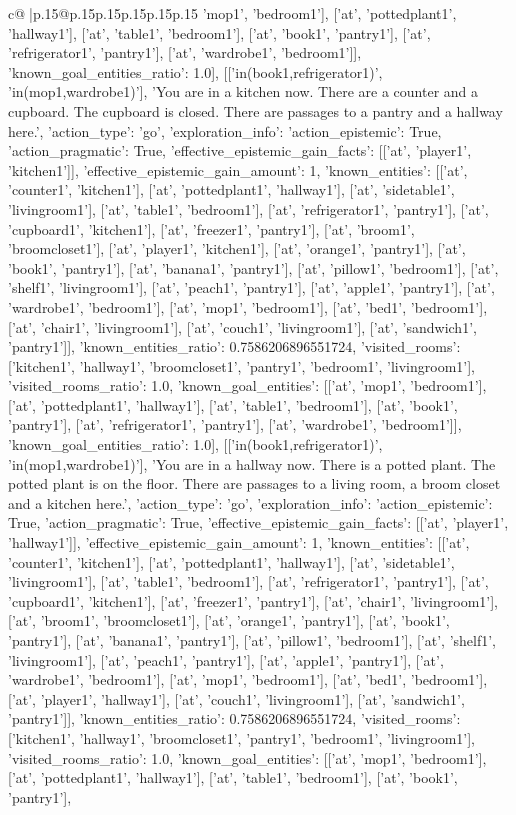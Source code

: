 \documentclass{article}
\begin{document}
{\begin{supertabular}{c@{$\;$}|p{.15\linewidth}@{}p{.15\linewidth}p{.15\linewidth}p{.15\linewidth}p{.15\linewidth}p{.15\linewidth}}
{{{'mop1', 'bedroom1'], ['at', 'pottedplant1', 'hallway1'], ['at', 'table1', 'bedroom1'], ['at', 'book1', 'pantry1'], ['at', 'refrigerator1', 'pantry1'], ['at', 'wardrobe1', 'bedroom1']], 'known_goal_entities_ratio': 1.0}}], [['in(book1,refrigerator1)', 'in(mop1,wardrobe1)'], 'You are in a kitchen now. There are a counter and a cupboard. The cupboard is closed. There are passages to a pantry and a hallway here.', {'action_type': 'go', 'exploration_info': {'action_epistemic': True, 'action_pragmatic': True, 'effective_epistemic_gain_facts': [['at', 'player1', 'kitchen1']], 'effective_epistemic_gain_amount': 1, 'known_entities': [['at', 'counter1', 'kitchen1'], ['at', 'pottedplant1', 'hallway1'], ['at', 'sidetable1', 'livingroom1'], ['at', 'table1', 'bedroom1'], ['at', 'refrigerator1', 'pantry1'], ['at', 'cupboard1', 'kitchen1'], ['at', 'freezer1', 'pantry1'], ['at', 'broom1', 'broomcloset1'], ['at', 'player1', 'kitchen1'], ['at', 'orange1', 'pantry1'], ['at', 'book1', 'pantry1'], ['at', 'banana1', 'pantry1'], ['at', 'pillow1', 'bedroom1'], ['at', 'shelf1', 'livingroom1'], ['at', 'peach1', 'pantry1'], ['at', 'apple1', 'pantry1'], ['at', 'wardrobe1', 'bedroom1'], ['at', 'mop1', 'bedroom1'], ['at', 'bed1', 'bedroom1'], ['at', 'chair1', 'livingroom1'], ['at', 'couch1', 'livingroom1'], ['at', 'sandwich1', 'pantry1']], 'known_entities_ratio': 0.7586206896551724, 'visited_rooms': ['kitchen1', 'hallway1', 'broomcloset1', 'pantry1', 'bedroom1', 'livingroom1'], 'visited_rooms_ratio': 1.0, 'known_goal_entities': [['at', 'mop1', 'bedroom1'], ['at', 'pottedplant1', 'hallway1'], ['at', 'table1', 'bedroom1'], ['at', 'book1', 'pantry1'], ['at', 'refrigerator1', 'pantry1'], ['at', 'wardrobe1', 'bedroom1']], 'known_goal_entities_ratio': 1.0}}], [['in(book1,refrigerator1)', 'in(mop1,wardrobe1)'], 'You are in a hallway now. There is a potted plant. The potted plant is on the floor. There are passages to a living room, a broom closet and a kitchen here.', {'action_type': 'go', 'exploration_info': {'action_epistemic': True, 'action_pragmatic': True, 'effective_epistemic_gain_facts': [['at', 'player1', 'hallway1']], 'effective_epistemic_gain_amount': 1, 'known_entities': [['at', 'counter1', 'kitchen1'], ['at', 'pottedplant1', 'hallway1'], ['at', 'sidetable1', 'livingroom1'], ['at', 'table1', 'bedroom1'], ['at', 'refrigerator1', 'pantry1'], ['at', 'cupboard1', 'kitchen1'], ['at', 'freezer1', 'pantry1'], ['at', 'chair1', 'livingroom1'], ['at', 'broom1', 'broomcloset1'], ['at', 'orange1', 'pantry1'], ['at', 'book1', 'pantry1'], ['at', 'banana1', 'pantry1'], ['at', 'pillow1', 'bedroom1'], ['at', 'shelf1', 'livingroom1'], ['at', 'peach1', 'pantry1'], ['at', 'apple1', 'pantry1'], ['at', 'wardrobe1', 'bedroom1'], ['at', 'mop1', 'bedroom1'], ['at', 'bed1', 'bedroom1'], ['at', 'player1', 'hallway1'], ['at', 'couch1', 'livingroom1'], ['at', 'sandwich1', 'pantry1']], 'known_entities_ratio': 0.7586206896551724, 'visited_rooms': ['kitchen1', 'hallway1', 'broomcloset1', 'pantry1', 'bedroom1', 'livingroom1'], 'visited_rooms_ratio': 1.0, 'known_goal_entities': [['at', 'mop1', 'bedroom1'], ['at', 'pottedplant1', 'hallway1'], ['at', 'table1', 'bedroom1'], ['at', 'book1', 'pantry1'], }}}
\end{supertabular}}
\end{document}
